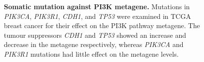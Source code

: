 \begin{figure}[!ht]
\begin{mdframed}
\begin{center}
    \end{center}
    \caption[Somatic mutation against PI3K metagene]{\small \textbf{Somatic mutation against PI3K metagene.} Mutations in \textit{PIK3CA}, \textit{PIK3R1}, \textit{CDH1}, and \textit{TP53} were examined in TCGA breast cancer for their effect on the PI3K \citep{Gatza2011} pathway metagene. The tumour suppressors \textit{CDH1} and \textit{TP53} showed an increase and decrease in the metagene respectively, whereas \textit{PIK3CA} and \textit{PIK3R1} mutations had little effect on the metagene levels.
}
\label{fig:mutation_expr_mg}
\end{mdframed}
\end{figure}

